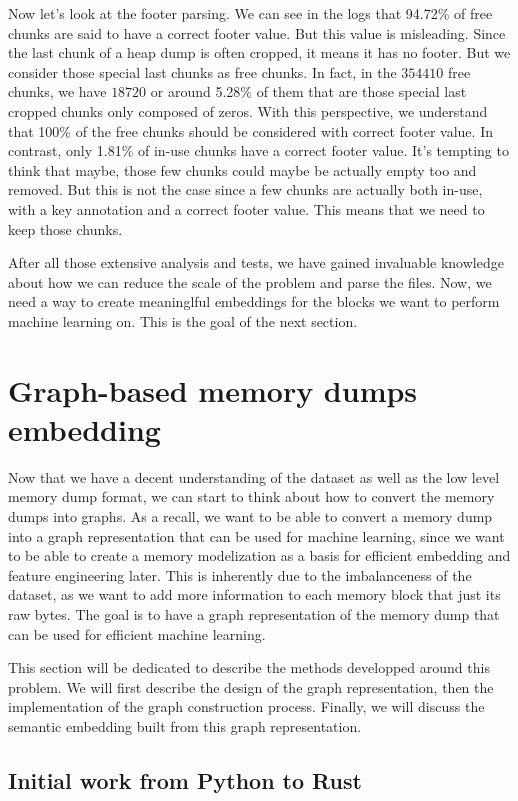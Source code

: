     Now let's look at the footer parsing. We can see in the logs that 94.72\% of free chunks are said to have a correct footer value. But this value is misleading. Since the last chunk of a heap dump is often cropped, it means it has no footer. But we consider those special last chunks as free chunks. In fact, in the $354410$ free chunks, we have $18720$ or around 5.28\% of them that are those special last cropped chunks only composed of zeros. With this perspective, we understand that 100\% of the free chunks should be considered with correct footer value. In contrast, only 1.81\% of in-use chunks have a correct footer value. It's tempting to think that maybe, those few chunks could maybe be actually empty too and removed. But this is not the case since a few chunks are actually both in-use, with a key annotation and a correct footer value. This means that we need to keep those chunks. 

    After all those extensive analysis and tests, we have gained invaluable knowledge about how we can reduce the scale of the problem and parse the files. Now, we need a way to create meaninglful embeddings for the blocks we want to perform machine learning on. This is the goal of the next section.

\section{Graph-based memory dumps embedding}\label{chap:mem_2_graph}
Now that we have a decent understanding of the dataset as well as the low level memory dump format, we can start to think about how to convert the memory dumps into graphs. As a recall, we want to be able to convert a memory dump into a graph representation that can be used for machine learning, since we want to be able to create a memory modelization as a basis for efficient embedding and feature engineering later. This is inherently due to the imbalanceness of the dataset, as we want to add more information to each memory block that just its raw bytes. The goal is to have a graph representation of the memory dump that can be used for efficient machine learning.

This section will be dedicated to describe the methods developped around this problem. We will first describe the design of the graph representation, then the implementation of the graph construction process. Finally, we will discuss the semantic embedding built from this graph representation.

\subsection{Initial work from Python to Rust}

